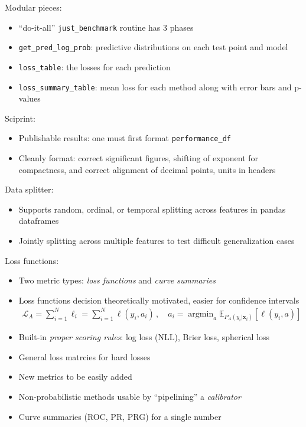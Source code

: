 \documentclass[a0,landscape]{a0poster}
\renewcommand{\vec}[1]{{\boldsymbol{\mathbf{#1}}}} %
\newcommand{\E}{\mathbb{E}}
\newcommand{\Loss}{\mathcal{L}}
\newcommand{\loss}{\ell}
\DeclareMathOperator*{\argmin}{argmin}
\newcommand{\code}{\texttt}
\begin{document}
\begin{multicols}{3}
Modular pieces:
\begin{itemize}
  \item ``do-it-all'' \code{just\_benchmark} routine has 3 phases
  \item \code{get\_pred\_log\_prob}: predictive distributions on each test point and model
  \item \code{loss\_table}: the losses for each prediction
  \item \code{loss\_summary\_table}: mean loss for each method along with error bars and p-values
\end{itemize}

Sciprint:
\begin{itemize}
  \item Publishable results: one must first format \code{performance\_df}
  \item Cleanly format: correct significant figures, shifting of exponent for compactness, and correct alignment of decimal points, units in headers
\end{itemize}
%
Data splitter:
\begin{itemize}
  \item Supports random, ordinal, or temporal splitting across features in pandas dataframes
  \item Jointly splitting across multiple features to test difficult generalization cases
\end{itemize}

Loss functions:
\begin{itemize}
  \item Two metric types: \emph{loss functions} and \emph{curve summaries}
  \item Loss functions decision theoretically motivated, easier for confidence intervals
  \begin{align}
    \Loss_A = \sum_{i=1}^N \loss_i = \sum_{i=1}^N \loss(y_i, a_i)\,, \quad a_i = \argmin_a \E_{P_A(y_i|\vec x_i)}[\loss(y_i, a)]
  \end{align}
  \item Built-in \emph{proper scoring rules}: log loss (NLL), Brier loss, spherical loss
  \item General loss matrcies for hard losses
  \item New metrics to be easily added
  \item Non-probabilistic methods usable by ``pipelining'' a \emph{calibrator}
  \item Curve summaries (ROC, PR, PRG) for a single number
\end{itemize}


\end{multicols}
\end{document}
